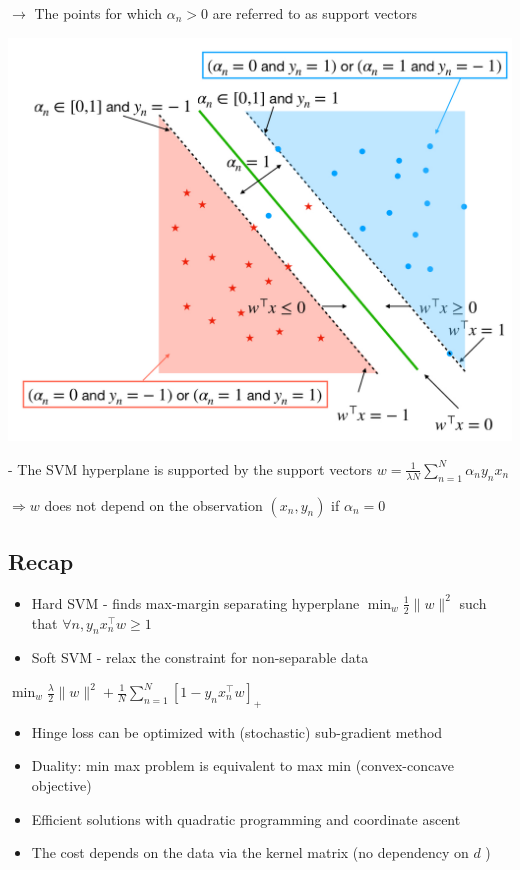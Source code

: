 $\rightarrow$ The points for which $\alpha_{n}>0$ are referred to as support vectors

\includegraphics*[width=0.7\columnwidth]{figures/svm_dual_formulation.jpeg}

- The SVM hyperplane is supported by the support vectors
$
w=\frac{1}{\lambda N} \sum_{n=1}^{N} \alpha_{n} y_{n} x_{n}
$

$\Rightarrow w$ does not depend on the observation $\left(x_{n}, y_{n}\right)$ if $\alpha_{n}=0$

\subsection*{Recap}
\begin{itemize}
  \item Hard SVM - finds max-margin separating hyperplane $\min _{w} \frac{1}{2}\|w\|^{2}$ such that $\forall n, y_{n} x_{n}^{\top} w \geq 1$

  \item Soft SVM - relax the constraint for non-separable data

\end{itemize}

$
\min _{w} \frac{\lambda}{2}\|w\|^{2}+\frac{1}{N} \sum_{n=1}^{N}\left[1-y_{n} x_{n}^{\top} w\right]_{+}
$

\begin{itemize}
  \item Hinge loss can be optimized with (stochastic) sub-gradient method

  \item Duality: min max problem is equivalent to max min (convex-concave objective)

  \item Efficient solutions with quadratic programming and coordinate ascent

  \item The cost depends on the data via the kernel matrix (no dependency on $d$ )

\end{itemize}